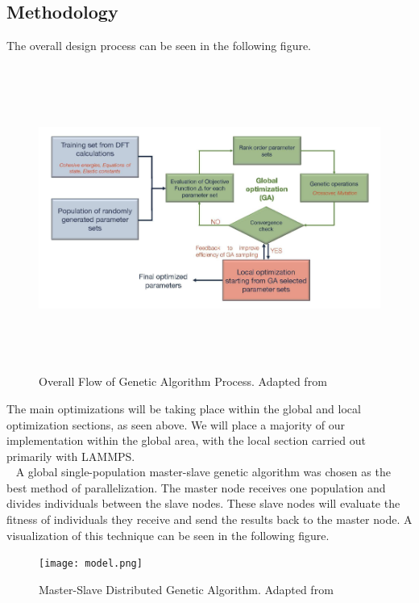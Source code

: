 \documentclass[letterpaper, 12pt]{article}
\begin{document}
\begin{flushleft}
\newpage
\section*{Methodology}
 The overall design process can be seen in the following figure.

 \begin{figure}[H]
 	\includegraphics[width=\linewidth,height=10cm,keepaspectratio]{flowchart.png}
 	\caption[Overall Flow of Genetic Algorithm Process]{Overall Flow of Genetic Algorithm Process. Adapted from \cite{Narayanan}}
 	\label{fig:arch}
 \end{figure}

 The main optimizations will be taking place within the global and local optimization sections, as seen above. We will place a majority of our implementation within the global area, with the local section carried out primarily with LAMMPS.\\
 ~\newline 
 A global single-population master-slave genetic algorithm was chosen as the best method of parallelization. The master node receives one population and divides individuals between the slave nodes.  These slave nodes will evaluate the fitness of individuals they receive and send the results back to the master node.  A visualization of this technique can be seen in the following figure.
 
 \begin{figure}[H]
 	\centering
 	\texttt{[image: model.png]}
 	\caption[Master-Slave Genetic Algorithm Implementation]{Master-Slave Distributed Genetic Algorithm. Adapted from \cite{Cantu}}
 	\label{fig:arch}
 \end{figure}



\end{flushleft}
\end{document}
